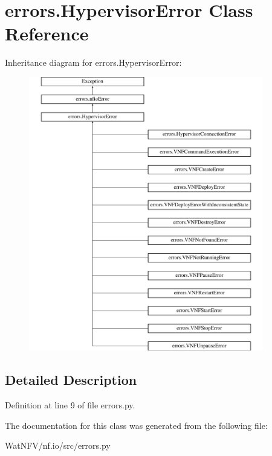 \hypertarget{classerrors_1_1HypervisorError}{\section{errors.\-Hypervisor\-Error Class Reference}
\label{classerrors_1_1HypervisorError}
}
Inheritance diagram for errors.\-Hypervisor\-Error\-:\begin{figure}[H]
\begin{center}
\leavevmode
\includegraphics[height=12.000000cm]{classerrors_1_1HypervisorError}
\end{center}
\end{figure}


\subsection{Detailed Description}


Definition at line 9 of file errors.\-py.



The documentation for this class was generated from the following file\-:\begin{DoxyCompactItemize}
\item 
Wat\-N\-F\-V/nf.\-io/src/errors.\-py\end{DoxyCompactItemize}
